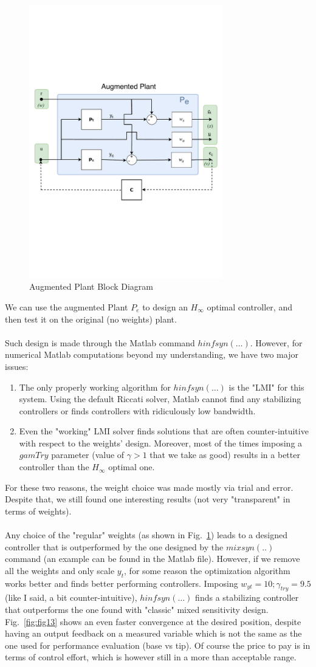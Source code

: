 \documentclass[a4paper, 12pt]{article}
\def\FigureTwelve{\centering\includegraphics[width=0.75\textwidth]{Figures/fig12.pdf}}
\begin{document}
\begin{figure}[h!]
    \FigureTwelve
    \caption{Augmented Plant Block Diagram}
    \label{fig:fig12}
\end{figure}
We can use the augmented Plant $P_e$ to design an $H_\infty$ optimal controller, and then test it on the original (no weights) plant.
\\\\
Such design is made through the Matlab command $hinfsyn(\dots)$. However, for numerical Matlab computations beyond my understanding, we have two major issues:
\begin{enumerate}
    \item The only properly working algorithm for $hinfsyn(\dots)$ is the "LMI" for this system. Using the default Riccati solver, Matlab cannot find any stabilizing controllers or finds controllers with ridiculously low bandwidth.
    \item Even the "working" LMI solver finds solutions that are often counter-intuitive with respect to the weights' design. Moreover, most of the times imposing a $gamTry$ parameter (value of $\gamma > 1$ that we take as good) results in a better controller than the $H_\infty$ optimal one.
\end{enumerate}
For these two reasons, the weight choice was made mostly via trial and error. Despite that, we still found one interesting results (not very "transparent" in terms of weights).
\\\\
Any choice of the "regular" weights (as shown in Fig.~\ref{fig:fig12}) leads to a designed controller that is outperformed by the one designed by the $mixsyn(..)$ command (an example can be found in the Matlab file). However, if we remove all the weights and only scale $y_t$, for some reason the optimization algorithm works better and finds better performing controllers. 
Imposing $w_{yt} = 10; \gamma_{try} = 9.5$ (like I said, a bit counter-intuitive), $hinfsyn(\dots)$ finds a stabilizing controller that outperforms the one found with "classic" mixed sensitivity design.
Fig.~\ref{fig:fig13} shows an even faster convergence at the desired position, despite having an output feedback on a measured variable which is not the same as the one used for performance evaluation (base vs tip). Of course the price to pay is in terms of control effort, which is however still in a more than acceptable range.
\end{document}
